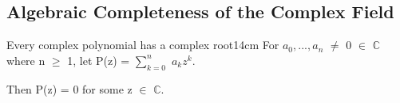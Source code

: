     \vspace{0.5cm}





\subsection{ Algebraic Completeness of the Complex Field }

    \begin{wtheorem}{Every complex polynomial has a complex root}{14cm}
        For $a_0,...,a_n$ $\not =$ 0 $\in$ $\mathbb{C}$ where n $\geq$ 1,
        let P(z) = $\sum_{k=0}^n$ $a_k z^k$.

        Then P(z) = 0 for some z $\in$ $\mathbb{C}$.
    \end{wtheorem}

